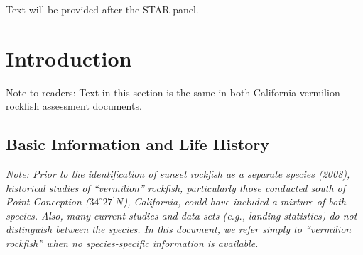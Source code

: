 \documentclass[11pt,
  english,
  a4paper,
]{article}
\begin{document}
\leavevmode\tagmcend\tagstructend

Text will be provided after the STAR panel.

\pagebreak
\setlength{\parskip}{5mm plus1mm minus1mm}
\setcounter{page}{1}
\renewcommand{\thefigure}{\arabic{figure}}
\renewcommand{\thetable}{\arabic{table}}
\setcounter{table}{0}
\setcounter{figure}{0}


\hypertarget{introduction}{%
\section{Introduction}\label{introduction}}

\leavevmode\tagmcend\tagstructend

Note to readers: Text in this section is the same in both California vermilion rockfish assessment documents.


\hypertarget{basic-information-and-life-history}{%
\subsection{Basic Information and Life History}\label{basic-information-and-life-history}}

\leavevmode\tagmcend\tagstructend

\emph{Note: Prior to the identification of sunset rockfish as a separate species {(2008)\leavevmode\tagmcend\tagstructend}, historical studies of ``vermilion'' rockfish, particularly those conducted south of Point Conception ($34^\circ 27^\prime N$), California, could have included a mixture of both species. Also, many current studies and data sets (e.g., landing statistics) do not distinguish between the species. In this document, we refer simply to ``vermilion rockfish'' when no species-specific information is available.}
\end{document}
